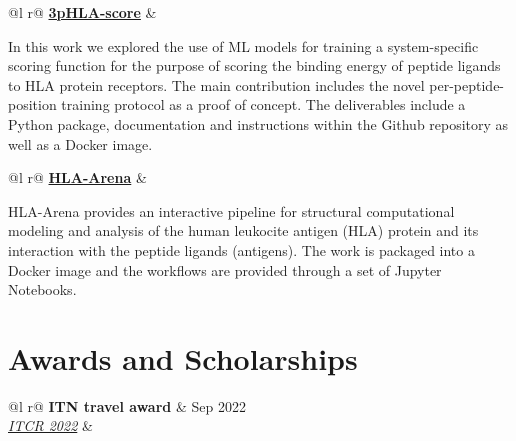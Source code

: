 \documentclass[a4paper,12pt]{article}
\begin{document}
\begin{tabularx}{\linewidth}{ @{}l r@{} }
 \href{https://github.com/KavrakiLab/3pHLA-score}{\faGithub \textbf{3pHLA-score}} &\\[3.75pt]
\begin{minipage}[t]{\linewidth}
In this work we explored the use of ML models for training a system-specific scoring function for the purpose of scoring the binding energy of peptide ligands to HLA protein receptors. The main contribution includes the novel per-peptide-position training protocol as a proof of concept. The deliverables include a Python package, documentation and instructions within the Github repository as well as a Docker image.
\end{minipage}
\end{tabularx}

\begin{tabularx}{\linewidth}{ @{}l r@{} }
 \href{https://github.com/KavrakiLab/HLA-Arena}{\faGithub \textbf{HLA-Arena}} &\\[3.75pt]
\begin{minipage}[t]{\linewidth}
HLA-Arena provides an interactive pipeline for structural computational modeling and analysis of the human leukocite antigen (HLA) protein and its interaction with the peptide ligands (antigens). The work is packaged into a Docker image and the workflows are provided through a set of Jupyter Notebooks.
\end{minipage}
\end{tabularx}



\section{Awards and Scholarships}

\begin{tabularx}{\linewidth}{ @{}l r@{} }
\textbf{ITN travel award} & \hfill Sep 2022 \\
\textit{\href{https://itcr2022.org/}{ITCR 2022}} & \\[3.75pt]
\end{tabularx}
\end{document}
